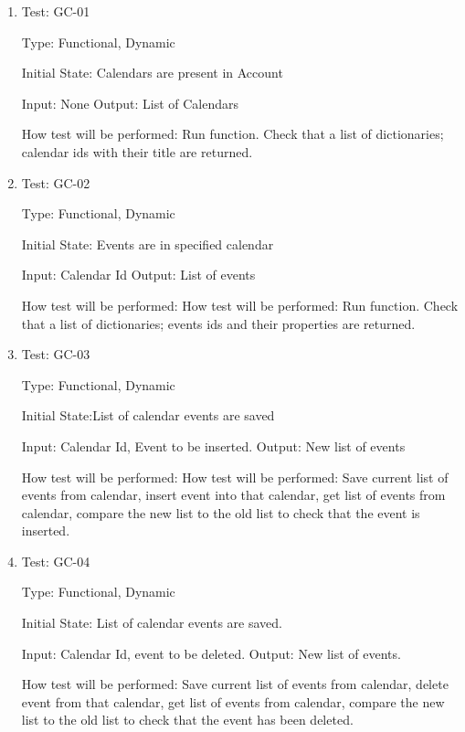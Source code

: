 \documentclass[12pt, titlepage]{article}
\begin{document}
\begin{enumerate}

\item{Test: GC-01\\}

Type: Functional, Dynamic
					
Initial State: Calendars are present in Account
					
Input: None
Output: List of Calendars
					
How test will be performed: Run function. Check that a list of dictionaries; calendar ids with their title are returned.

\item{Test: GC-02\\}

Type: Functional, Dynamic
					
Initial State: Events are in specified calendar
					
Input: Calendar Id
Output: List of events
					
How test will be performed: How test will be performed: Run function. Check that a list of dictionaries; events ids and their properties are returned.

\item{Test: GC-03\\}

Type: Functional, Dynamic
					
Initial State:List of calendar events are saved
					
Input: Calendar Id, Event to be inserted.
Output: New list of events
					
How test will be performed: How test will be performed: Save current list of events from calendar, insert event into that calendar, get list of events from calendar, compare the new list to the old list to check that the event is inserted. 

\item{Test: GC-04\\}

Type: Functional, Dynamic
					
Initial State: List of calendar events are saved.

					
Input: Calendar Id, event to be deleted. 
Output: New list of events.
					
How test will be performed: Save current list of events from calendar, delete event from that calendar, get list of events from calendar, compare the new list to the old list to check that the event has been deleted.

\end{enumerate}
\end{document}
